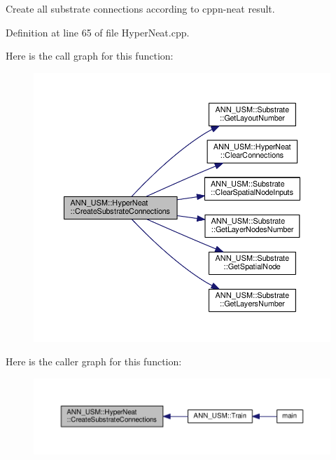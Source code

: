 Create all substrate connections according to cppn-\/neat result. 



Definition at line 65 of file Hyper\-Neat.\-cpp.



Here is the call graph for this function\-:
\nopagebreak
\begin{figure}[H]
\begin{center}
\leavevmode
\includegraphics[width=350pt]{class_a_n_n___u_s_m_1_1_hyper_neat_a0eb24949bc741c24f12bd812d519de8c_cgraph}
\end{center}
\end{figure}




Here is the caller graph for this function\-:
\nopagebreak
\begin{figure}[H]
\begin{center}
\leavevmode
\includegraphics[width=350pt]{class_a_n_n___u_s_m_1_1_hyper_neat_a0eb24949bc741c24f12bd812d519de8c_icgraph}
\end{center}
\end{figure}


